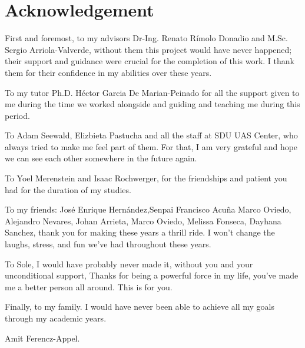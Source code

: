 \section*{Acknowledgement}
First and foremost, to my advisors Dr-Ing. Renato Rímolo Donadio and M.Sc.  Sergio Arriola-Valverde, without them this project would have never happened; their support and guidance were crucial for the completion of this work. I thank them for their confidence in my abilities over these years.

To my tutor Ph.D. Héctor Garcia De Marian-Peinado for all the support given to me during the time we worked alongside and guiding and teaching me during this period.

To Adam Seewald, Elizbieta Pastucha and all the staff at SDU UAS Center, who always tried to make me feel part of them. For that, I am very grateful and hope we can see each other somewhere in the future again.

To Yoel Merenstein and Isaac Rochwerger, for the friendships and patient you had for the duration of my studies. 

To my friends: José Enrique Hernández,Senpai Francisco Acuña Marco Oviedo, Alejandro Nevares, Johan Arrieta, Marco Oviedo, Melissa Fonseca, Dayhana Sanchez, thank you for making these years a thrill ride.  I won’t change the laughs, stress, and fun we’ve had throughout these years. 

To Sole, I would have probably never made it, without you and your unconditional support, Thanks for being a powerful force in my life, you’ve made me a better person all around. This is for you.

Finally, to my family. I would have never been able to achieve all my goals through my academic years. 

Amit Ferencz-Appel.